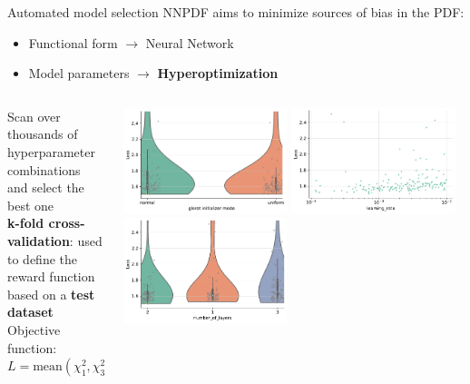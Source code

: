 \documentclass[aspectratio=169,9pt]{beamer}
\begin{document}
\begin{frame}[t]{Automated model selection}
	NNPDF aims to minimize sources of bias in the PDF:
	\begin{itemize}
	    \item Functional form $\rightarrow$ Neural Network
	    \item Model parameters $\rightarrow$ \textbf{Hyperoptimization}
	\end{itemize}
    \begin{columns}
        \begin{column}{0.48\textwidth}
            Scan over thousands of hyperparameter combinations and select the best one \\
            \vspace*{0.8em}
            {\bf k-fold cross-validation}: used to define the reward function based on a {\bf test dataset}\\ 
            \vspace*{0.8em}
            Objective function: \\
            $L=\textrm{mean}(\chi_1^2,\chi_3^2,\chi_2^2,\ldots, \chi_k^2)$
        \end{column}
        \begin{column}{0.48\textwidth}
            \begin{center}
                \includegraphics[width=0.48\textwidth]{sec_methodology_hyperopt_plot_initializer.pdf}
                \includegraphics[width=0.48\textwidth]{sec_methodology_hyperopt_plot_lr.pdf} \\
                \includegraphics[width=0.48\textwidth]{sec_methodology_hyperopt_plot_number_of_layers.pdf}

\end{center}
\end{column}
\end{columns}
\end{frame}
\end{document}

